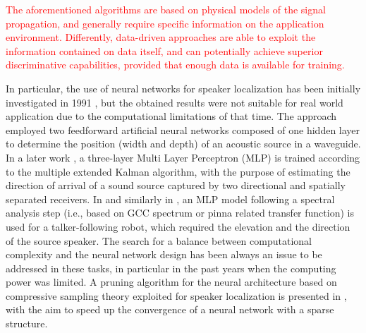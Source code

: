 \documentclass[review]{elsarticle}
\begin{document}

\textcolor{red}{The aforementioned algorithms are based on physical models of the signal propagation, and generally require specific information on the application environment. Differently, data-driven approaches are able to exploit the information contained on data itself, and can potentially achieve superior discriminative capabilities, provided that enough data is available for training.  }


In particular, the use of neural networks for speaker localization has been initially investigated in 1991 \cite{zakarauskas1991artificial}, but the obtained results were not suitable for real world application due to the computational limitations of that time. The approach employed two feedforward artificial neural networks composed of one hidden layer to determine the position (width and depth) of an acoustic source in a waveguide.  In a later work \cite{datum1996artificial}, a three-layer Multi Layer Perceptron (MLP) is trained according to the multiple extended Kalman algorithm, with the purpose of estimating the direction of arrival of a sound source captured by two directional and spatially separated receivers. In \cite{Mumolo200369} and similarly in \cite{murray2011neural}, an MLP model following a spectral analysis step (i.e., based on GCC spectrum or pinna related transfer function) is used for a talker-following robot, which required the elevation and the direction of the source speaker. The search for a balance between computational complexity and the neural network design has been always an issue to be addressed in these tasks, in particular in the past years when the computing power was limited.  A pruning algorithm for the neural architecture based on compressive sampling theory exploited for speaker localization is presented in \cite{dehkordi2011compressive}, with the aim to speed up the convergence of a neural network with a sparse structure. 
\end{document}
